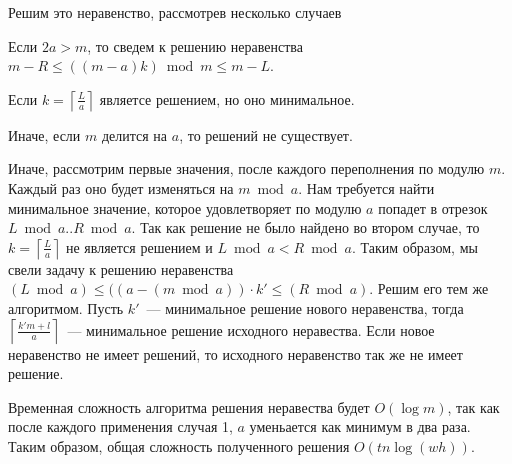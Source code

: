 Решим это неравенство, рассмотрев несколько случаев

\begin{shortnums}
\item Если $2a > m$, то сведем к решению неравенства $m - R \le ((m - a)k) \bmod m \le m - L$.
\item Если $k=\left\lceil \frac{L}{a}\right\rceil$ являетсе решением, но оно минимальное.
\item Иначе, если $m$ делится на $a$, то решений не существует.
\item Иначе, рассмотрим первые значения, после каждого переполнения по модулю $m$. Каждый раз оно будет изменяться на $m \bmod a$. Нам требуется найти минимальное значение, которое удовлетворяет по модулю $a$ попадет в отрезок $L \bmod a..R \bmod a$. Так как решение не было найдено во втором случае, то $k=\left\lceil \frac{L}{a}\right\rceil$ не является решением и $L \bmod a < R \bmod a$. Таким образом, мы свели задачу к решению неравенства $(L \bmod a) \le ((a - (m \bmod a)) \cdot k' \le (R \bmod a)$. Решим его тем же алгоритмом. Пусть $k'$~--- минимальное решение нового неравенства, тогда $\left\lceil \frac{k'm + l}{a} \right\rceil$~--- минимальное решение исходного неравества. Если новое неравенство не имеет решений, то исходного неравенство так же не имеет решение.
\end{shortnums}

Временная сложность алгоритма решения неравества будет $O(\log m)$, так как после
каждого применения случая 1, $a$ уменьается как минимум в два раза. Таким образом, общая сложность полученного решения $O(tn\log(wh))$.
